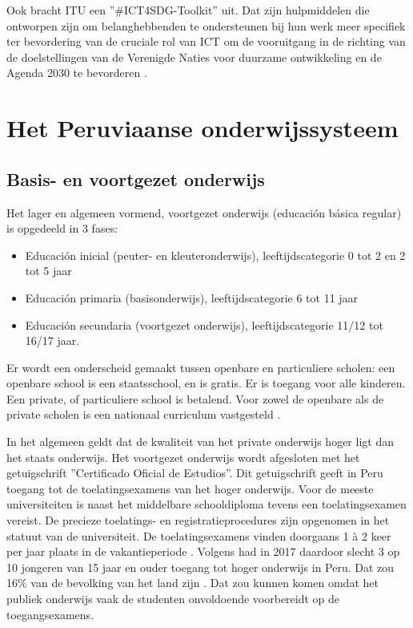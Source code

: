 Ook bracht ITU een ''\#ICT4SDG-Toolkit'' uit. Dat zijn hulpmiddelen die ontworpen zijn om belanghebbenden te ondersteunen bij hun werk meer specifiek ter bevordering van de cruciale rol van ICT om de vooruitgang in de richting van de doelstellingen van de Verenigde Naties voor duurzame ontwikkeling en de Agenda 2030 te bevorderen \autocite{ITU2015}.
 
\section{Het Peruviaanse onderwijssysteem}
\subsection{Basis- en voortgezet onderwijs}
Het lager en algemeen vormend, voortgezet onderwijs (educación básica regular) is opgedeeld in 3 fases:
 \begin{itemize}
\item Educación inicial (peuter- en kleuteronderwijs), leeftijdscategorie 0 tot 2 en 2 tot 5 jaar
\item Educación primaria (basisonderwijs), leeftijdscategorie 6 tot 11 jaar
\item Educación secundaria (voortgezet onderwijs), leeftijdscategorie 11/12 tot 16/17 jaar.
\end{itemize}
Er wordt een onderscheid gemaakt tussen openbare en particuliere scholen: een openbare school is een staatsschool, en is gratis. Er is toegang voor alle kinderen. Een private, of particuliere school is betalend. Voor zowel de openbare als de private scholen is een nationaal curriculum vastgesteld \autocite{Nuffic2015}.

In het algemeen geldt dat de kwaliteit van het private onderwijs hoger ligt dan het staats onderwijs. Het voortgezet onderwijs wordt afgesloten met het getuigschrift ''Certificado Oficial de Estudios''. Dit getuigschrift geeft in Peru toegang tot de toelatingsexamens van het hoger onderwijs. Voor de meeste universiteiten is naast het middelbare schooldiploma tevens een toelatingsexamen vereist. De precieze toelatings- en registratieprocedures zijn opgenomen in het statuut van de universiteit. De toelatingsexamens vinden doorgaans 1 à 2 keer per jaar plaats in de vakantieperiode \autocite{Nuffic2015}. Volgens \autocite{Repulbica2017} had in 2017 daardoor slecht 3 op 10 jongeren van 15 jaar en ouder toegang tot hoger onderwijs in Peru. Dat zou 16\% van de bevolking van het land zijn \autocite{NoSeQueEstudiar2020}. Dat zou kunnen komen omdat het publiek onderwijs vaak de studenten onvoldoende voorbereidt op de toegangsexamens.

